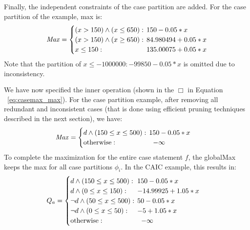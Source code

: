 \documentclass[twoside,11pt]{article}
\newcommand{\UB}{\mathit{UB}}
\newcommand{\LB}{\mathit{LB}}
\newcommand{\Root}{\mathit{Root}}
\newcommand{\Max}{\mathit{Max}}
\newcommand{\sqm}{\hspace{-2mm}}
\begin{document}
Finally, the independent constraints of the case partition are added. For the case partition of the example, max is: 
{%
\begin{align*}
\Max = 
\begin{cases}
(x > 150) \land (x \leq 650):    & \sqm 150 - 0.05 * x \\ 
(x > 150) \land (x \geq 650):    & \sqm 84.980494 + 0.05 * x \\ 
x \leq 150: & \sqm 135.00075 + 0.05 * x\\ 
\end{cases}
\end{align*}}
Note that the partition of $x \leq -1000000:  -99850 -0.05 * x$ is omitted due to inconsistency.

We have now specified the inner operation (shown in the $\Box$ in Equation ~\eqref{eq:casemax_max}). For the case partition example, after removing all redundant and inconsistent cases (that is done using efficient pruning techniques described in the next section), we have:
\begin{align*}
\Max & = 
\begin{cases}
d \land (150 \leq x \leq 500):    & \sqm 150 - 0.05 * x \\ 
\text{\normalsize otherwise} : & -\infty\\ 
\end{cases}
\end{align*}
To complete the maximization for the entire case statement $f$, the globalMax keeps the max for all case partitions $\phi_i$. In the CAIC example, this results in:
\begin{align*}
Q_a & = 
\begin{cases}
d \land (150 \leq x \leq 500):    & \sqm 150 - 0.05 * x \\ 
d \land (0 \leq x \leq 150):    & \sqm -14.99925 + 1.05 * x \\ 
\neg d \land (50 \leq x \leq 500):    & \sqm 50 - 0.05 * x \\ 
\neg d \land (0 \leq x \leq 50):    & \sqm -5 + 1.05 * x \\ 
\text{\normalsize otherwise} : & -\infty\\ 
\end{cases}
\end{align*}
\end{document}
